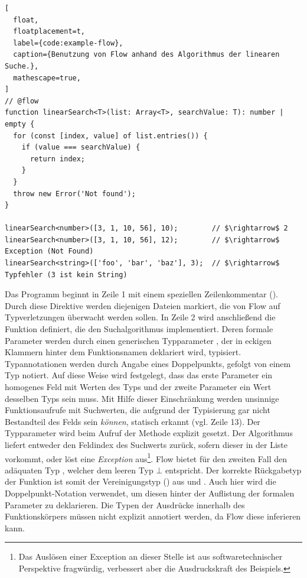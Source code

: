 \begin{lstlisting}[
  float,
  floatplacement=t,
  label={code:example-flow},
  caption={Benutzung von Flow anhand des Algorithmus der linearen Suche.},
  mathescape=true,
]
// @flow
function linearSearch<T>(list: Array<T>, searchValue: T): number | empty {
  for (const [index, value] of list.entries()) {
    if (value === searchValue) {
      return index;
    }
  }
  throw new Error('Not found');
}

linearSearch<number>([3, 1, 10, 56], 10);        // $\rightarrow$ 2
linearSearch<number>([3, 1, 10, 56], 12);        // $\rightarrow$ Exception (Not Found)
linearSearch<string>(['foo', 'bar', 'baz'], 3);  // $\rightarrow$ Typfehler (3 ist kein String)
\end{lstlisting}

Das Programm beginnt in Zeile 1 mit einem speziellen Zeilenkommentar (). Durch diese Direktive werden diejenigen Dateien markiert, die von Flow auf Typverletzungen überwacht werden sollen. In Zeile 2 wird anschließend die Funktion  definiert, die den Suchalgorithmus implementiert. Deren formale Parameter werden durch einen generischen Typparameter , der in eckigen Klammern hinter dem Funktionsnamen deklariert wird, typisiert. Typannotationen werden durch Angabe eines Doppelpunkts, gefolgt von einem Typ notiert. Auf diese Weise wird festgelegt, dass das erste Parameter  ein homogenes Feld mit Werten des Typs  und der zweite Parameter  ein Wert desselben Typs sein muss. Mit Hilfe dieser Einschränkung werden unsinnige Funktionsaufrufe mit Suchwerten, die aufgrund der Typisierung gar nicht Bestandteil des Felds sein \emph{können}, statisch erkannt (vgl. Zeile 13). Der Typparameter  wird beim Aufruf der Methode explizit gesetzt.
Der Algorithmus liefert entweder den Feldindex des Suchwerts zurück, sofern dieser in der Liste vorkommt, oder löst eine \textit{Exception} aus\footnote{Das Auslösen einer Exception an dieser Stelle ist aus softwaretechnischer Perspektive fragwürdig, verbessert aber die Ausdruckskraft des Beispiels.}. Flow bietet für den zweiten Fall den adäquaten Typ , welcher dem leeren Typ $\bot$ entspricht. Der korrekte Rückgabetyp der Funktion ist somit der Vereinigungstyp () aus  und . Auch hier wird die Doppelpunkt-Notation verwendet, um diesen hinter der Auflistung der formalen Parameter zu deklarieren. Die Typen der Ausdrücke innerhalb des Funktionskörpers müssen nicht explizit annotiert werden, da Flow diese inferieren kann.

